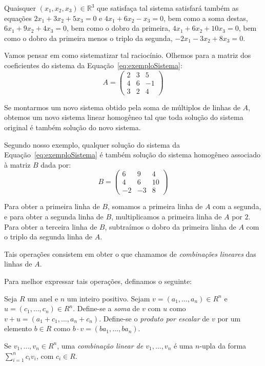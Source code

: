 Quaisquer $(x_1, x_2, x_3)\in \mathbb R^3$ que satisfaça tal sistema satisfará também as equações $2x_1 + 3x_2 + 5x_3 = 0$ e $4x_1 + 6x_2 - x_3 = 0$, bem como a soma destas, $6x_1 + 9x_2 + 4x_3 = 0$, bem como o dobro da primeira, $4x_1 + 6x_2 + 10x_3 = 0$, bem como o dobro da primeira menos o triplo da segunda, $-2x_1 - 3x_2 + 8x_3 = 0$.

Vamos pensar em como sistematizar tal raciocínio. Olhemos para a matriz dos coeficientes do sistema da Equação~\eqref{eq:exemploSistema}:
\begin{equation*}
    A = \begin{pmatrix}
        2 & 3 & 5 \\
        4 & 6 & -1 \\
        3 & 2 & 4
    \end{pmatrix}
\end{equation*}

Se montarmos um novo sistema obtido pela soma de múltiplos de linhas de $A$, obtemos um novo sistema linear homogêneo tal que toda solução do sistema original é também solução do novo sistema.

Segundo nosso exemplo, qualquer solução do sistema da Equação~\eqref{eq:exemploSistema} é também solução do sistema homogêneo associado à matriz $B$ dada por:
\begin{equation*}
    B = \begin{pmatrix}
        6 & 9 & 4 \\
        4 & 6 & 10 \\
        -2 & -3 & 8
    \end{pmatrix}
\end{equation*}

Para obter a primeira linha de $B$, somamos a primeira linha de $A$ com a segunda, e para obter a segunda linha de $B$, multiplicamos a primeira linha de $A$ por $2$.
Para obter a terceira linha de $B$, subtraímos o dobro da primeira linha de $A$ com o triplo da segunda linha de $A$.

Tais operações consistem em obter o que chamamos de \emph{combinações lineares} das linhas de $A$.

Para melhor expressar tais operações, definamos o seguinte:

\begin{definition}
    Seja $R$ um anel e $n$ um inteiro positivo. Sejam $v=(a_1, \dots, a_n)\in R^n$ e $u=(c_1, \dots, c_n)\in R^n$.
    Define-se a \emph{soma} de $v$ com $u$ como $v+u=(a_1+c_1, \dots, a_n+c_n)$.
    Define-se o \emph{produto por escalar} de $v$ por um elemento $b\in R$ como $b\cdot v=(ba_1, \dots, ba_n)$.

    Se $v_1, \dots, v_n\in R^n$, uma \emph{combinação linear de $v_1, \dots, v_n$} é uma $n$-upla da forma $\sum_{i=1}^n c_i v_i$, com $c_i\in R$.
\end{definition}

